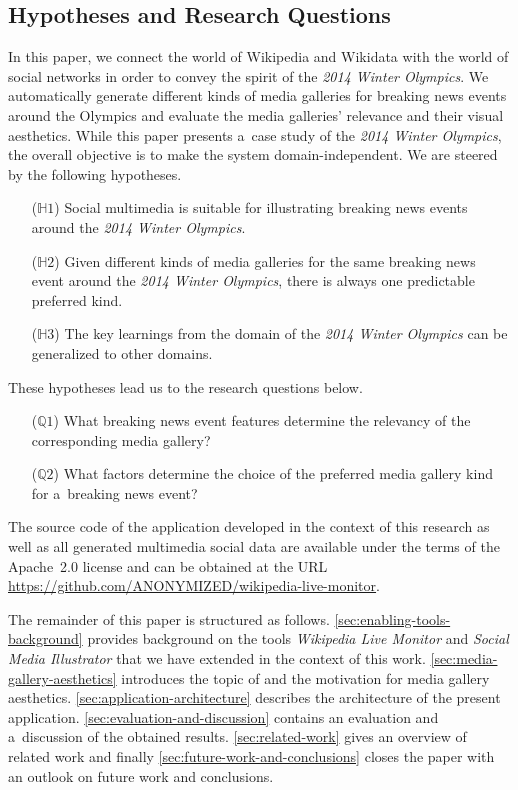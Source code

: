 \documentclass{sig-alternate}
\newcommand{\inlinelistingsize}{\fontsize{8pt}{11pt}}
\let\oldurl\url
\renewcommand{\url}[1]{\inlinelistingsize\oldurl{#1}}
\begin{document}
\subsection{Hypotheses and Research Questions}

In this paper, we connect the world of
Wikipedia and Wikidata with the world of social networks
in order to convey the spirit of the
\emph{2014 Winter Olympics}.
We automatically generate different kinds of media galleries
for breaking news events around the Olympics
and evaluate the media galleries' relevance
and their visual aesthetics.
While this paper presents a~case study
of the \emph{2014 Winter Olympics},
the overall objective is to make the system domain-inde\-pendent.
We are steered by the following hypotheses.

\begin{itemize}
  \itemsep0em
  \item[($\mathbb{H}1$)] Social multimedia is suitable for illustrating
    breaking news events around the \emph{2014 Winter Olympics}.
  \item[($\mathbb{H}2$)] Given different kinds of media galleries
    for the same breaking news event
    around the \emph{2014 Winter Olympics},
    there is always one predictable preferred kind.
  \item[($\mathbb{H}3$)] The key learnings from the domain of the
    \emph{2014 Winter Olympics} can be generalized
    to other domains.    
\end{itemize}

\noindent These hypotheses lead us to the research questions below.

\begin{itemize}
  \itemsep0em
  \item[($\mathbb{Q}1$)] What breaking news event features
    determine the relevancy of the corresponding media gallery?
  \item[($\mathbb{Q}2$)] What factors determine the choice
    of the preferred media gallery kind for a~breaking news event?
\end{itemize}

The source code of the application developed
in the context of this research as well as all generated
multimedia social data
are available under the terms of the Apache~2.0 license
and can be obtained at the URL \url{https://github.com/ANONYMIZED/wikipedia-live-monitor}.

The remainder of this paper is structured as follows.
\autoref{sec:enabling-tools-background} provides background
on the tools \emph{Wikipedia Live Monitor} and
\emph{Social Media Illustrator} that we have extended
in the context of this work.
\autoref{sec:media-gallery-aesthetics} introduces the topic of
and the motivation for media gallery aesthetics.
\autoref{sec:application-architecture} describes the architecture
of the present application.
\autoref{sec:evaluation-and-discussion} contains an evaluation
and a~discussion of the obtained results.
\autoref{sec:related-work} gives an overview of related work
and finally \autoref{sec:future-work-and-conclusions}
closes the paper with an outlook on future work
and conclusions.
\end{document}
